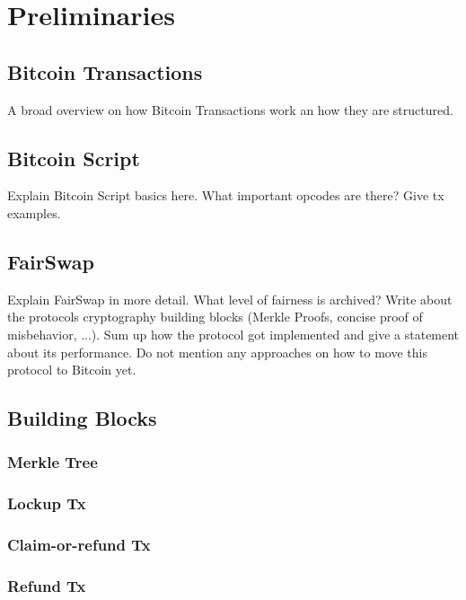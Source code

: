 \documentclass{cacthesis}
\newcounter{protocol}
\begin{document}
    \chapter{Preliminaries}
        \section{Bitcoin Transactions}
        A broad overview on how Bitcoin Transactions work an how they are structured.
        
        \section{Bitcoin Script}
        Explain Bitcoin Script basics here. What important opcodes are there? Give tx examples.
        
        \section{FairSwap}
        Explain FairSwap in more detail. What level of fairness is archived? Write about the protocols cryptography building blocks (Merkle Proofs, concise proof of misbehavior, ...). Sum up how the protocol got implemented and give a statement about its performance. Do not mention any approaches on how to move this protocol to Bitcoin yet.
        
        \section{Building Blocks}
        \subsection{Merkle Tree}
        \subsection{Lockup Tx}
        \subsection{Claim-or-refund Tx}
        \subsection{Refund Tx}
\end{document}
